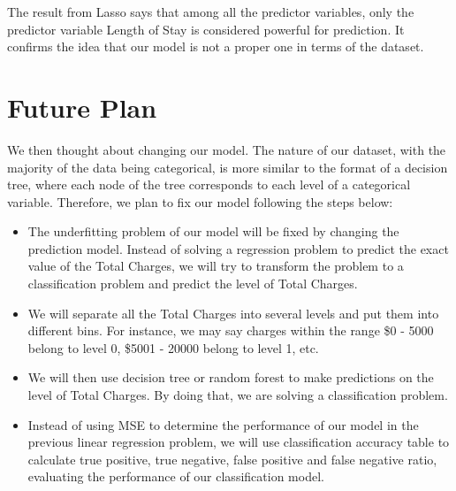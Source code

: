 \documentclass[journal, a4paper,11pt]{IEEEtran}
\begin{document}
	The result from Lasso says that among all the predictor variables, only the predictor variable Length of Stay is considered powerful for prediction. It confirms the idea that our model is not a proper one in terms of the dataset.

\section{Future Plan}

	We then thought about changing our model. The nature of our dataset, with the majority of the data being categorical, is more similar to the format of a decision tree, where each node of the tree corresponds to each level of a categorical variable. Therefore, we plan to fix our model following the steps below:
	\begin{itemize}
	\item The underfitting problem of our model will be fixed by changing the prediction model. Instead of solving a regression problem to predict the exact value of the Total Charges, we will try to transform the problem to a classification problem and predict the level of Total Charges.
	\item We will separate all the Total Charges into several levels and put them into different bins. For instance, we may say charges within the range \$0 - 5000 belong to level 0, \$5001 - 20000 belong to level 1, etc.
	\item We will then use decision tree or random forest to make predictions on the level of Total Charges. By doing that, we are solving a classification problem.
	\item Instead of using MSE to determine the performance of our model in the previous linear regression problem, we will use classification accuracy table to calculate true positive, true negative, false positive and false negative ratio, evaluating the performance of our classification model.
	\end{itemize}

	
\end{document}
